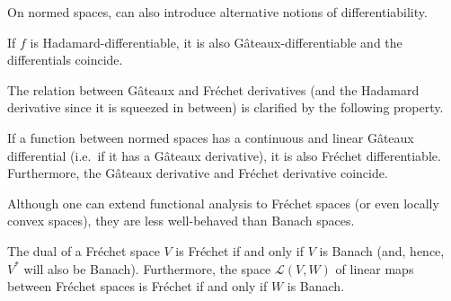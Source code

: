     On normed spaces, can also introduce alternative notions of differentiability.
    \begin{property}
        If $f$ is Hadamard-differentiable, it is also G\^ateaux-differentiable and the differentials coincide.
    \end{property}


    The relation between G\^ateaux and Fr\'echet derivatives (and the Hadamard derivative since it is squeezed in between) is clarified by the following property.
    \begin{property}
        If a function between normed spaces has a continuous and linear G\^ateaux differential (i.e.~if it has a G\^ateaux derivative), it is also Fr\'echet differentiable. Furthermore, the G\^ateaux derivative and Fr\'echet derivative coincide.
    \end{property}

    Although one can extend functional analysis to Fr\'echet spaces (or even locally convex spaces), they are less well-behaved than Banach spaces.
    \begin{property}
        The dual of a Fr\'echet space $V$ is Fr\'echet if and only if $V$ is Banach (and, hence, $V^*$ will also be Banach). Furthermore, the space $\mathcal{L}(V,W)$ of linear maps between Fr\'echet spaces is Fr\'echet if and only if $W$ is Banach.
    \end{property}

